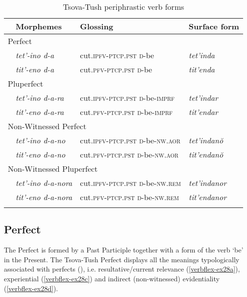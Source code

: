 \begin{table}

		\begin{tabular}{llll}
			\lsptoprule
			& {Morphemes} & {Glossing} & {Surface form} \\
			\midrule
			\multicolumn{4}{l}{Perfect}\\
			& \textit{tet'-ino d-a} & cut.\textsc{ipfv-ptcp.pst d-}be & \textit{tet'inda} \\
			& \textit{tit'-eno d-a} & cut.\textsc{pfv-ptcp.pst d-}be & \textit{tit'enda} \\
			
			\multicolumn{4}{l}{Pluperfect}\\
			& \textit{tet'-ino d-a-ra} & cut.\textsc{ipfv-ptcp.pst d-}be-\textsc{imprf} & \textit{tet'indar} \\
			& \textit{tit'-eno d-a-ra} & cut.\textsc{pfv-ptcp.pst d-}be-\textsc{imprf} & \textit{tit'endar} \\
			
			\multicolumn{4}{l}{Non-Witnessed Perfect}\\
			& \textit{tet'-ino d-a-no} & cut.\textsc{ipfv-ptcp.pst d-}be-\textsc{nw.aor} & \textit{tet'indan\u{o}} \\
			& \textit{tit'-eno d-a-no} & cut.\textsc{pfv-ptcp.pst d-}be-\textsc{nw.aor} & \textit{tit'endan\u{o}} \\  
			
			\multicolumn{4}{l}{Non-Witnessed Pluperfect}\\
			& \textit{tet'-ino d-a-nora} & cut.\textsc{ipfv-ptcp.pst d-}be-\textsc{nw.rem} & \textit{tet'indanor} \\
			& \textit{tit'-eno d-a-nora} & cut.\textsc{pfv-ptcp.pst d-}be-\textsc{nw.rem} & \textit{tit'endanor} \\ 
			\lspbottomrule
		\end{tabular}

	\caption{Tsova-Tush periphrastic verb forms}
	\label{table-periverbflex}
\end{table}


\subsection{Perfect}

The Perfect is formed by a Past Participle together with a form of the verb `be' in the Present. The Tsova-Tush Perfect displays all the meanings typologically associated with perfects (\cites[24]{comrie85}{plungian16}{verhees19}), i.e. resultative/current relevance (\ref{verbflex-ex28a}), experiential (\ref{verbflex-ex28c}) and indirect (non-witnessed) evidentiality (\ref{verbflex-ex28d}).

